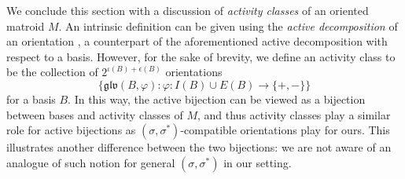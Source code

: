 \documentclass[12pt]{amsart}
\numberwithin{equation}{section}
\theoremstyle{definition}
\newcommand{\Bcal}{{\mathcal B}}
\newcommand{\Ocal}{{\mathcal O}}
\newcommand{\GLV}{\mathfrak{glv}}
\newcommand{\Chiho}[1]{\todo[size=\tiny,inline,color=green!30]{#1 \\ \hfill --- Ch.}}
\begin{document}

\medskip

We conclude this section with a discussion of {\em activity classes} of an oriented matroid $M$.
An intrinsic definition can be given using the {\em active decomposition} of an orientation \cite{GLV_AB2b}, a counterpart of the aforementioned active decomposition with respect to a basis.
However, for the sake of brevity, we define an activity class to be the collection of 
$2^{\iota(B)+ \epsilon(B)}$
orientations 
\[
\big\{\GLV(B,\varphi):
\varphi:I(B)\cup E(B)\rightarrow\{+,-\}\big\}
\]
for a basis $B$.
In this way, the active bijection can be viewed as a bijection between bases and activity classes of $M$, and thus activity classes  play a similar role for active bijections as $(\sigma,\sigma^*)$-compatible orientations play for ours.
This illustrates another difference between the two bijections: we are not aware of an analogue of such notion for general $(\sigma,\sigma^*)$ in our setting.

\end{document}
